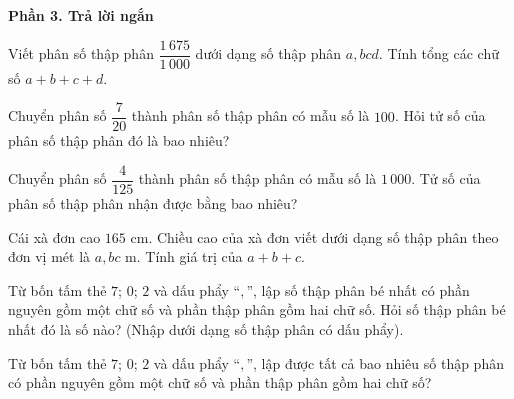 \textbf{Phần 3. Trả lời ngắn}

\begin{ex} %
Viết phân số thập phân $\dfrac{1\,675}{1\,000}$ dưới dạng số thập phân $a{,}bcd$. Tính tổng các chữ số $a + b + c + d$.
\end{ex}

\begin{ex} %
Chuyển phân số $\dfrac{7}{20}$ thành phân số thập phân có mẫu số là $100$. Hỏi tử số của phân số thập phân đó là bao nhiêu?
\end{ex}

\begin{ex} %
Chuyển phân số $\dfrac{4}{125}$ thành phân số thập phân có mẫu số là $1\,000$. Tử số của phân số thập phân nhận được bằng bao nhiêu?
\end{ex}

\begin{ex} %
Cái xà đơn cao $165\text{ cm}$. Chiều cao của xà đơn viết dưới dạng số thập phân theo đơn vị mét là $a{,}bc\text{ m}$. Tính giá trị của $a + b + c$.
\end{ex}

\begin{ex} %
Từ bốn tấm thẻ $7$; $0$; $2$ và dấu phẩy ``$,$'', lập số thập phân bé nhất có phần nguyên gồm một chữ số và phần thập phân gồm hai chữ số. Hỏi số thập phân bé nhất đó là số nào? (Nhập dưới dạng số thập phân có dấu phẩy).
\end{ex}

\begin{ex} %
Từ bốn tấm thẻ $7$; $0$; $2$ và dấu phẩy ``$,$'', lập được tất cả bao nhiêu số thập phân có phần nguyên gồm một chữ số và phần thập phân gồm hai chữ số?
\end{ex}
